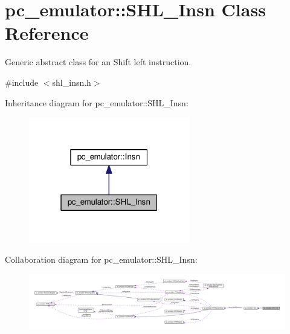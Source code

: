 \hypertarget{classpc__emulator_1_1SHL__Insn}{}\section{pc\+\_\+emulator\+:\+:S\+H\+L\+\_\+\+Insn Class Reference}
\label{classpc__emulator_1_1SHL__Insn}


Generic abstract class for an Shift left instruction.  




{\ttfamily \#include $<$shl\+\_\+insn.\+h$>$}



Inheritance diagram for pc\+\_\+emulator\+:\+:S\+H\+L\+\_\+\+Insn\+:\nopagebreak
\begin{figure}[H]
\begin{center}
\leavevmode
\includegraphics[width=199pt]{classpc__emulator_1_1SHL__Insn__inherit__graph}
\end{center}
\end{figure}


Collaboration diagram for pc\+\_\+emulator\+:\+:S\+H\+L\+\_\+\+Insn\+:\nopagebreak
\begin{figure}[H]
\begin{center}
\leavevmode
\includegraphics[width=350pt]{classpc__emulator_1_1SHL__Insn__coll__graph}
\end{center}
\end{figure}
